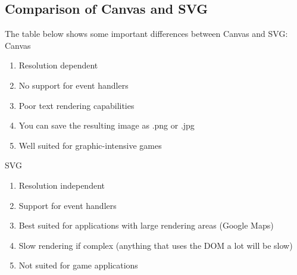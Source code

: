 \subsection{Comparison of Canvas and SVG}
The table below shows some important differences between Canvas and SVG:
Canvas

\begin{enumerate}
\item	Resolution dependent
\item	No support for event handlers
\item	Poor text rendering capabilities
\item	You can save the resulting image as .png or .jpg
\item	Well suited for graphic-intensive games
\end{enumerate}	
SVG

\begin{enumerate}
\item	Resolution independent
\item	Support for event handlers
\item	Best suited for applications with large rendering areas (Google Maps)
\item	Slow rendering if complex (anything that uses the DOM a lot will be slow)
\item	Not suited for game applications
\end{enumerate}
